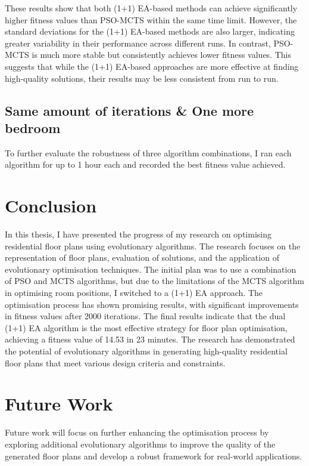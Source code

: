 \documentclass[]{article}
\begin{document}
These results show that both (1+1) EA-based methods can achieve significantly higher fitness values than PSO-MCTS within the same time limit. However, the standard deviations for the (1+1) EA-based methods are also larger, indicating greater variability in their performance across different runs. In contrast, PSO-MCTS is much more stable but consistently achieves lower fitness values. This suggests that while the (1+1) EA-based approaches are more effective at finding high-quality solutions, their results may be less consistent from run to run.

\subsection{Same amount of iterations \& One more bedroom}
To further evaluate the robustness of three algorithm combinations, I ran each algorithm for up to 1 hour each and recorded the best fitness value achieved.

\section{Conclusion}
In this thesis, I have presented the progress of my research on optimising residential floor plans using evolutionary algorithms. The research focuses on the representation of floor plans, evaluation of solutions, and the application of evolutionary optimisation techniques. The initial plan was to use a combination of PSO and MCTS algorithms, but due to the limitations of the MCTS algorithm in optimising room positions, I switched to a (1+1) EA approach. The optimisation process has shown promising results, with significant improvements in fitness values after 2000 iterations.
The final results indicate that the dual (1+1) EA algorithm is the most effective strategy for floor plan optimisation, achieving a fitness value of 14.53 in 23 minutes. The research has demonstrated the potential of evolutionary algorithms in generating high-quality residential floor plans that meet various design criteria and constraints.

\section{Future Work}
Future work will focus on further enhancing the optimisation process by exploring additional evolutionary algorithms to improve the quality of the generated floor plans and develop a robust framework for real-world applications.
\end{document}
